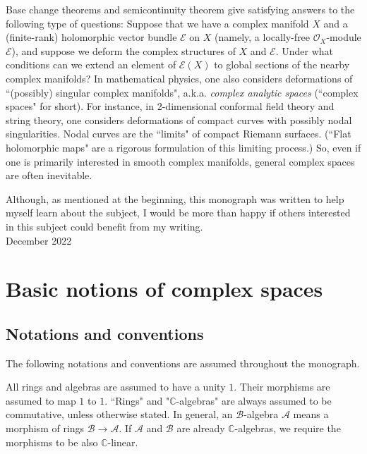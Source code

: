 \documentclass[12pt,b5paper,notitlepage]{report}
\theoremstyle{definition}
\theoremstyle{plain}
\newcommand{\mc}{\mathcal}
\newcommand{\scr}{\mathscr}
\newcommand{\Cbb}{\mathbb C}
\numberwithin{equation}{section}
\begin{document}
Base change theorems and semicontinuity theorem give satisfying answers to the following type of questions: Suppose that we have a complex manifold $X$ and a (finite-rank) holomorphic vector bundle $\scr E$ on $X$ (namely, a locally-free $\scr O_X$-module $\scr E$), and suppose we deform the complex structures of $X$ and $\scr E$. Under what conditions can we extend an element of $\scr E(X)$ to global sections of  the nearby complex manifolds? In mathematical physics, one also considers deformations of ``(possibly) singular complex manifolds", a.k.a. \textit{complex analytic spaces} (``complex spaces" for short). For instance, in 2-dimensional conformal field theory and string theory, one considers deformations of compact curves with possibly nodal singularities. Nodal curves are the ``limits" of compact Riemann surfaces. (``Flat holomorphic maps" are a rigorous formulation of this limiting process.) So, even if one is primarily interested in smooth complex manifolds, general complex spaces are often inevitable.


Although, as mentioned at the beginning, this monograph was written to help myself learn about the subject, I would be more than happy if others interested in this subject could benefit from my writing.\\








\hfill December 2022

\chapter{Basic notions of complex spaces}

\section{Notations and conventions}




The following notations and conventions are assumed throughout the monograph.

All rings and algebras are assumed to have a unity $1$.  Their morphisms are assumed to map $1$ to $1$. ``Rings" and "$\Cbb$-algebras" are always assumed to be commutative, unless otherwise stated. In general, an $\mc B$-algebra $\mc A$ means a morphism of rings $\mc B\rightarrow\mc A$. If $\mc A$ and $\mc B$ are already $\Cbb$-algebras, we require the morphisms to be also $\Cbb$-linear.
\end{document}
